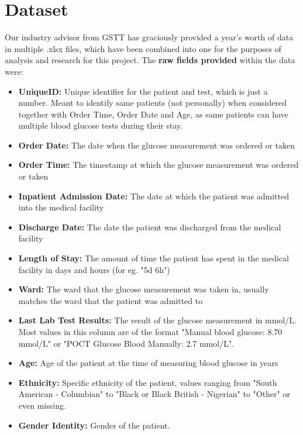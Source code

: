 \section{Dataset}

\par{\noindent

    Our industry advisor from GSTT has graciously provided a year's worth of data in multiple .xlsx files, which have been combined into one for the purposes of analysis and research for this project. The \textbf{raw fields provided} within the data were:  

    \begin{itemize}
        \item \textbf{UniqueID:} Unique identifier for the patient and test, which is just a number. Meant to identify same patients (not personally) when considered together with Order Time, Order Date and Age, as same patients can have multiple blood glucose tests during their stay. 
        \item \textbf{Order Date:} The date when the glucose measurement was ordered or taken 
        \item \textbf{Order Time:} The timestamp at which the glucose measurement was ordered or taken
        \item \textbf{Inpatient Admission Date:} The date at which the patient was admitted into the medical facility
        \item \textbf{Discharge Date:} The date the patient was discharged from the medical facility
        \item \textbf{Length of Stay:} The amount of time the patient has spent in the medical facility in days and hours (for eg. "5d 6h")
        \item \textbf{Ward:} The ward that the glucose measurement was taken in, usually matches the ward that the patient was admitted to
        \item \textbf{Last Lab Test Results:} The result of the glucose measurement in mmol/L. Most values in this column are of the format "Manual blood glucose: 8.70 mmol/L" or "POCT Glucose Blood Manually: 2.7 mmol/L".
        \item \textbf{Age:} Age of the patient at the time of measuring blood glucose in years
        \item \textbf{Ethnicity:} Specific ethnicity of the patient, values ranging from "South American - Columbian" to "Black or Black British - Nigerian" to "Other" or even missing.
        \item \textbf{Gender Identity:} Gender of the patient.

\end{itemize}}
